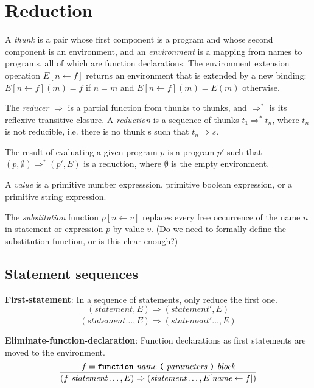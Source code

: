 \section*{Reduction}

A \emph{thunk} is a pair whose first component is a program
and whose
second component is an environment, and an
\emph{environment} is a mapping from names to programs, all of which are
function declarations. The environment extension operation
$E [ n \leftarrow f]$ returns an environment that is extended by
a new binding: $E[n \leftarrow f](m) = f$ if $n = m$ and
$E[n \leftarrow f](m) = E(m)$ otherwise.

The \emph{reducer} $\Rightarrow$ is a partial function from thunks to thunks,
and $\Rightarrow^*$ is its reflexive transitive closure.
A \emph{reduction} is a sequence of thunks
$t_1 \Rightarrow^* t_n$, where $t_n$ is not reducible, i.e. there is no thunk
s such that $t_n \Rightarrow s$.

The result of evaluating a given program $p$ is a program $p'$
such that $(p, \emptyset) \Rightarrow^* (p', E)$ is a reduction,
where $\emptyset$ is the empty environment.

A \emph{value} is a primitive number expresssion, primitive boolean expression,
or a primitive string expression.

The \emph{substitution} function
$p [ n \leftarrow v ]$ replaces every free occurrence of the name $n$
in statement or expression $p$ by value $v$.
(Do we need to formally define the substitution function, or is this clear
enough?)

\subsection*{Statement sequences}


\textbf{First-statement}: In a sequence of statements, only reduce the first
one.
\[
\frac{
  (\textit{statement},E) \Rightarrow (\textit{statement}',E)
}{
  (\textit{statement} \ldots, E)
  \Rightarrow
  (\textit{statement}' \ldots, E)
}
\]

\vspace{10mm}

\textbf{Eliminate-function-declaration}: Function declarations as first
statements are moved to the environment.
\[
\frac{
             f = \textbf{\texttt{function}}\  \textit{name}
                 \ \textbf{\texttt{(}}\  \textit{parameters}
                 \ \textbf{\texttt{)}}\ \textit{block}
}{
( f\ \textit{statement} \ldots, E)
  \Rightarrow
  ( \textit{statement} \ldots, E[\textit{name} \leftarrow f])
}
\]

